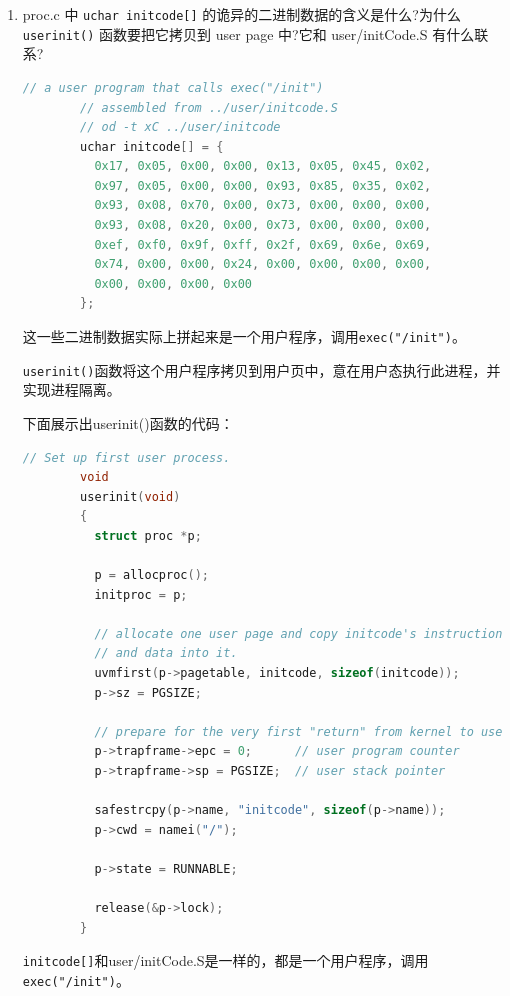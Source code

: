 \documentclass[UTF8]{article}
\begin{document}
\begin{enumerate}
    \item proc.c 中 \texttt{uchar initcode[]} 的诡异的二进制数据的含义是什么?为什么 \texttt{userinit()} 函数要把它拷贝到 user page 中?它和 user/initCode.S 有什么联系?
    
    \begin{lstlisting}[language=C]
        // a user program that calls exec("/init")
        // assembled from ../user/initcode.S
        // od -t xC ../user/initcode
        uchar initcode[] = {
          0x17, 0x05, 0x00, 0x00, 0x13, 0x05, 0x45, 0x02,
          0x97, 0x05, 0x00, 0x00, 0x93, 0x85, 0x35, 0x02,
          0x93, 0x08, 0x70, 0x00, 0x73, 0x00, 0x00, 0x00,
          0x93, 0x08, 0x20, 0x00, 0x73, 0x00, 0x00, 0x00,
          0xef, 0xf0, 0x9f, 0xff, 0x2f, 0x69, 0x6e, 0x69,
          0x74, 0x00, 0x00, 0x24, 0x00, 0x00, 0x00, 0x00,
          0x00, 0x00, 0x00, 0x00
        };        
    \end{lstlisting}
    
    这一些二进制数据实际上拼起来是一个用户程序，调用\texttt{exec("/init")}。
    
    \texttt{userinit()}函数将这个用户程序拷贝到用户页中，意在用户态执行此进程，并实现进程隔离。
    
    下面展示出userinit()函数的代码：

    \begin{lstlisting}[language=C]
        // Set up first user process.
        void
        userinit(void)
        {
          struct proc *p;
        
          p = allocproc();
          initproc = p;
          
          // allocate one user page and copy initcode's instructions
          // and data into it.
          uvmfirst(p->pagetable, initcode, sizeof(initcode));
          p->sz = PGSIZE;
        
          // prepare for the very first "return" from kernel to user.
          p->trapframe->epc = 0;      // user program counter
          p->trapframe->sp = PGSIZE;  // user stack pointer
        
          safestrcpy(p->name, "initcode", sizeof(p->name));
          p->cwd = namei("/");
        
          p->state = RUNNABLE;
        
          release(&p->lock);
        }
    \end{lstlisting}

    \texttt{initcode[]}和user/initCode.S是一样的，都是一个用户程序，调用\texttt{exec("/init")}。


\end{enumerate}
\end{document}
